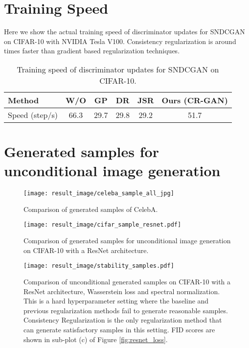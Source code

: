 \documentclass{article} \usepackage{iclr2020_conference,times}
\begin{document}
\section{Training Speed}
\renewcommand{\thefigure}{C\arabic{figure}}
\setcounter{figure}{0}
\renewcommand{\thetable}{C\arabic{table}}
\setcounter{table}{0}

Here we show the actual training speed of discriminator updates for SNDCGAN on CIFAR-10 with NVIDIA Tesla V100. Consistency regularization is around  times faster than gradient based regularization techniques.


\begin{table}[hbt]
\centering
\begin{tabular}{l|ccccc}
 \hline
Method   & W/O &  GP & DR & JSR  & Ours (CR-GAN) \\ 
\hline
Speed (step/s)  & 66.3 & 29.7  & 29.8 & 29.2   & 51.7 \\

 \hline \hline
\end{tabular}
\caption{Training speed of discriminator updates for SNDCGAN on CIFAR-10. 
} 
\label{tab:speed_comparison}
\end{table}
\newpage 
\section{Generated samples for unconditional image generation}

\renewcommand{\thefigure}{D\arabic{figure}}
\setcounter{figure}{0}
\renewcommand{\thetable}{D\arabic{table}}
\setcounter{table}{0}

\begin{figure}[hbt]
    \centering
    \texttt{[image: result\_image/celeba\_sample\_all\_jpg]}
    \caption{
    Comparison of generated samples of CelebA.
    }
    \label{fig:celeba_samples}
\end{figure}



\begin{figure}[hbt]
    \centering
    \texttt{[image: result\_image/cifar\_sample\_resnet.pdf]}
    \caption{
    Comparison of generated samples for unconditional image generation on CIFAR-10 with a ResNet architecture. 
    }
    \label{fig:cifar_samples_unconditional}
\end{figure}

\begin{figure}[hbt]
    \centering
    \texttt{[image: result\_image/stability\_samples.pdf]}
    \caption{
    Comparison of unconditional generated samples on CIFAR-10 with a ResNet  architecture,  Wasserstein loss and spectral normalization. This is a hard hyperparameter setting where the baseline and previous regularization methods fail to generate reasonable samples. Consistency Regularization is the only regularization method that can generate satisfactory samples in this setting. FID scores are shown in sub-plot (c) of Figure \ref{fig:resnet_loss}.
    }
    \label{fig:stability_sample}
\end{figure}
\end{document}
